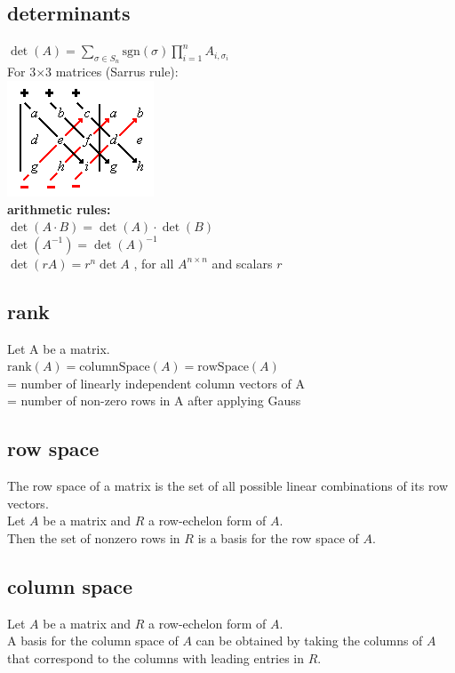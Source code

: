 \begin{multicols}{3}
\subsection{determinants}
$\det(A) = \sum_{\sigma \in S_n} \text{sgn}(\sigma) \prod_{i=1}^n A_{i,\sigma_i}$\\
For 3$\times$3 matrices (Sarrus rule):\\
\includegraphics[scale=0.6]{sarrus}\\

\textbf{arithmetic rules:}\\
$\det (A \cdot B) = \det (A) \cdot \det (B)$\\
$\det (A^{-1}) = \det (A)^{-1}$\\
$\det\left(rA\right) = r^n\det A\,\,$,  for all $A^{n\times n}$ and scalars $r$

\subsection{rank}
Let A be a matrix.\\
$\text{rank}(A) = \text{columnSpace}(A) = \text{rowSpace}(A)$ \\
\quad = number of linearly independent column vectors of A\\
\quad = number of non-zero rows in A after applying Gauss\\

\subsection{row space}
The row space of a matrix is the set of all possible linear combinations of its row vectors.\\
Let $A$ be a matrix and $R$ a row-echelon form of $A$.\\
Then the set of nonzero rows in $R$ is a basis for the row space of $A$.

\subsection{column space}
Let $A$ be a matrix and $R$ a row-echelon form of $A$.\\
A basis for the column space of $A$ can be obtained by taking the columns of $A$ that correspond to the columns with leading entries in $R$.


\end{multicols}
